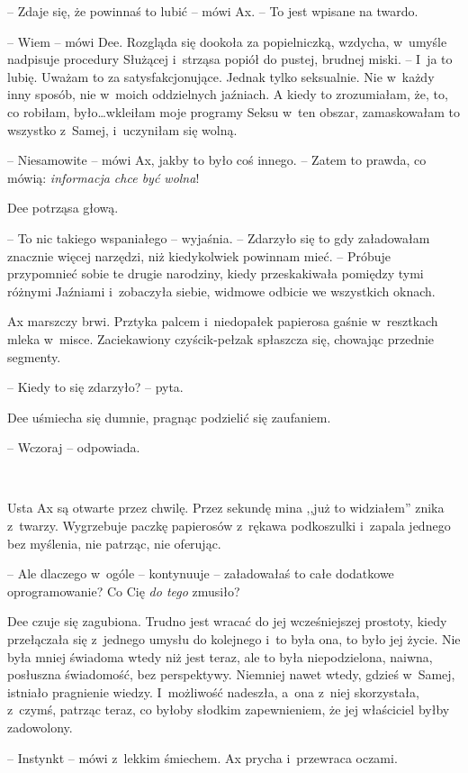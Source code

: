 \documentclass[oneside,polish,11pt,sfheadings]{mwbk}
\begin{document}
-- Zdaje się, że powinnaś to lubić -- mówi Ax. -- To jest wpisane na
twardo.

-- Wiem -- mówi Dee. Rozgląda się dookoła za popielniczką, wzdycha, w~umyśle nadpisuje procedury Służącej i~strząsa popiół do pustej, brudnej
miski. -- I~ja to lubię. Uważam to za satysfakcjonujące. Jednak tylko
seksualnie. Nie w~każdy inny sposób, nie w~moich oddzielnych jaźniach. A
kiedy to zrozumiałam, że, to, co robiłam, było\ldots wkleiłam moje programy
Seksu w~ten obszar, zamaskowałam to wszystko z~Samej, i~uczyniłam się
wolną.

-- Niesamowite -- mówi Ax, jakby to było coś innego. -- Zatem to prawda, co
mówią: \emph{informacja chce być wolna}!

Dee potrząsa głową. 

-- To nic takiego wspaniałego -- wyjaśnia. -- Zdarzyło
się to gdy załadowałam znacznie więcej narzędzi, niż kiedykolwiek
powinnam mieć. -- Próbuje przypomnieć sobie te drugie narodziny, kiedy
przeskakiwała pomiędzy tymi różnymi Jaźniami i~zobaczyła siebie, widmowe
odbicie we wszystkich oknach.

Ax marszczy brwi. Prztyka palcem i~niedopałek papierosa gaśnie w~resztkach mleka w~misce. Zaciekawiony czyścik-pełzak spłaszcza się,
chowając przednie segmenty. 

-- Kiedy to się zdarzyło? -- pyta.

Dee uśmiecha się dumnie, pragnąc podzielić się zaufaniem. 

-- Wczoraj -- odpowiada.

~

Usta Ax są otwarte przez chwilę. Przez sekundę mina ,,już to widziałem''
znika z~twarzy. Wygrzebuje paczkę papierosów z~rękawa podkoszulki i~zapala jednego bez myślenia, nie patrząc, nie oferując. 

-- Ale dlaczego w~ogóle -- kontynuuje -- załadowałaś to całe dodatkowe oprogramowanie? Co
Cię \emph{do tego} zmusiło?

Dee czuje się zagubiona. Trudno jest wracać do jej wcześniejszej
prostoty, kiedy przełączała się z~jednego umysłu do kolejnego i~to była
ona, to było jej życie. Nie była mniej świadoma wtedy niż jest teraz,
ale to była niepodzielona, naiwna, posłuszna świadomość, bez
perspektywy. Niemniej nawet wtedy, gdzieś w~Samej, istniało pragnienie
wiedzy. I~możliwość nadeszła, a~ona z~niej skorzystała, z~czymś, patrząc
teraz, co byłoby słodkim zapewnieniem, że jej właściciel byłby
zadowolony.

-- Instynkt -- mówi z~lekkim śmiechem. Ax prycha i~przewraca oczami.
\end{document}
